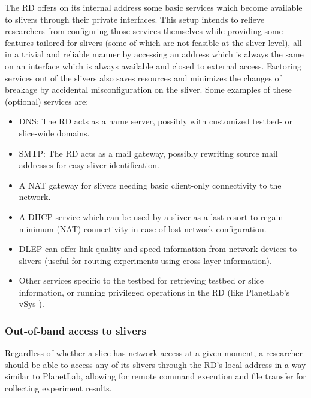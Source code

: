 \documentclass[conference]{IEEEtran}
\begin{document}
The RD offers on its internal address some basic services which become
available to slivers through their private interfaces.  This setup intends to
relieve researchers from configuring those services themselves while providing
some features tailored for slivers (some of which are not feasible at
the sliver level), all in a trivial and reliable manner by accessing an
address which is always the same on an interface which is always available and
closed to external access.  Factoring services out of the slivers also saves
resources and minimizes the changes of breakage by accidental misconfiguration
on the sliver.  Some examples of these (optional) services are:

\begin{itemize}
\item DNS: The RD acts as a name server, possibly with customized testbed- or
  slice-wide domains.
\item SMTP: The RD acts as a mail gateway, possibly rewriting source mail
  addresses for easy sliver identification.
\item A NAT gateway for slivers needing basic client-only connectivity to the
  network.
\item A DHCP service which can be used by a sliver as a last resort to regain
  minimum (NAT) connectivity in case of lost network configuration.
\item DLEP \cite{dlep} can offer link quality and
  speed information from network devices to slivers (useful for routing experiments using
  cross-layer information).
\item Other services specific to the testbed for retrieving testbed or slice
  information, or running privileged operations in the RD (like PlanetLab's
  vSys \cite{vsys}).
\end{itemize}


\subsubsection{Out-of-band access to slivers}

Regardless of whether a slice has network access at a given moment, a
researcher should be able to access any of its slivers through the RD's local address in a
way similar to PlanetLab, allowing for remote
command execution and file transfer for collecting experiment results.
\end{document}

